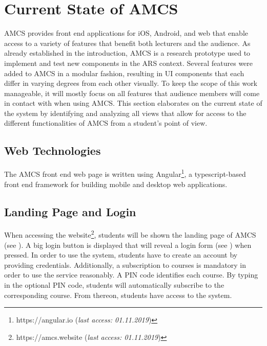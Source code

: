 \chapter{Current State of AMCS}
\label{chapter:stateoftheart}
AMCS provides front end applications for iOS, Android, and web that enable access to a variety of features that benefit both lecturers and the audience.
As already established in the introduction, AMCS is a research prototype used to implement and test new components in the ARS context.
Several features were added to AMCS in a modular fashion, resulting in UI components that each differ in varying degrees from each other visually. 
To keep the scope of this work manageable, it will mostly focus on all features that audience members will come in contact with when using AMCS.  
This section elaborates on the current state of the system by identifying and analyzing all views that allow for access to the different functionalities of AMCS from a student's point of view. 

\section{Web Technologies}
The AMCS front end web page is written using Angular\footnote{https://angular.io (\emph{last access: 01.11.2019})}, a typescript-based front end framework for building mobile and desktop web applications.

\section{Landing Page and Login}
\label{section:landingpage}
When accessing the website\footnote{https://amcs.website (\emph{last access: 01.11.2019})}, students will be shown the landing page of AMCS (see ). A big login button is displayed that will reveal a login form (see ) when pressed.
In order to use the system, students have to create an account by providing credentials.
\newline
\newline
Additionally, a subscription to courses is mandatory in order to use the service reasonably. A PIN code identifies each course. By typing in the optional PIN code, students will automatically subscribe to the corresponding course. From thereon, students have access to the system. 


